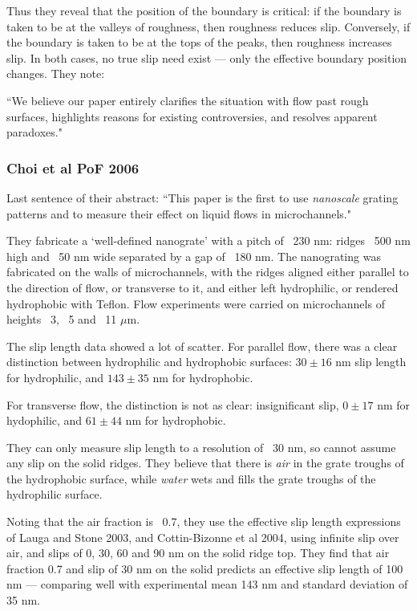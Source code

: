 \documentclass{article}
\begin{document}
Thus they reveal that the position of the boundary is critical: if the boundary is taken to be at the valleys of roughness, then roughness reduces slip.  Conversely, if the boundary is taken to be at the tops of the peaks, then roughness increases slip.  In both cases, no true slip need exist --- only the effective boundary position changes. 
They note:

``We believe our paper entirely clarifies the situation with flow past rough surfaces, highlights reasons for existing controversies, and resolves apparent paradoxes."

\subsubsection*{Choi et al PoF 2006}

Last sentence of their abstract: ``This paper is the first to use \emph{nanoscale} grating patterns and to measure their effect on liquid flows in microchannels."

They fabricate a `well-defined nanograte' with a pitch of ~230 nm: ridges ~500 nm high and ~50 nm wide separated by a gap of ~180 nm.  The nanograting was fabricated on the walls of microchannels, with the ridges aligned either parallel to the direction of flow, or transverse to it, and either left hydrophilic, or rendered hydrophobic with Teflon. Flow experiments were carried on microchannels of heights ~3, ~5 and ~11 $\mu$m.

The slip length data showed a lot of scatter.  For parallel flow, there was a clear distinction between hydrophilic and hydrophobic surfaces: $30\pm16$ nm slip length for hydrophilic, and $143\pm35$ nm for hydrophobic.

For transverse flow, the distinction is not as clear: insignificant slip, $0 \pm 17$ nm for hydophilic, and $61\pm44$ nm for hydrophobic.

They can only measure slip length to a resolution of ~30 nm, so cannot assume any slip on the solid ridges.  They believe that there is \emph{air} in the grate troughs of the hydrophobic surface, while \emph{water} wets and fills the grate troughs of the hydrophilic surface.

Noting that the air fraction is ~0.7, they use the effective slip length expressions of Lauga and Stone 2003, and Cottin-Bizonne et al 2004, using infinite slip over air, and slips of 0, 30, 60  and 90 nm on the solid ridge top.  They find that air fraction 0.7 and slip of 30 nm on the solid predicts an effective slip length of 100 nm --- comparing well with experimental mean 143 nm and standard deviation of 35 nm.
\end{document}
